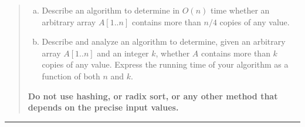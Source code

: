 \documentclass[11pt]{article}
\begin{document}



\begin{quote}

\begin{enumerate}[(a)]
	\item Describe an algorithm to determine in $O(n)$ time whether an
	arbitrary array $A[1..n]$ contains more than $n/4$ copies of any value.
	\item Describe and analyze an algorithm to determine, given an arbitrary
	array $A[1..n]$ and an integer $k$, whether $A$
	contains more than $k$ copies of any value. Express the running time
	of your algorithm as a function of both $n$ and $k$.
\end{enumerate}
{\bf Do not use hashing, or radix sort, or any other method that depends
	on the precise input values.} 

\end{quote}
\hrule
\end{document}
